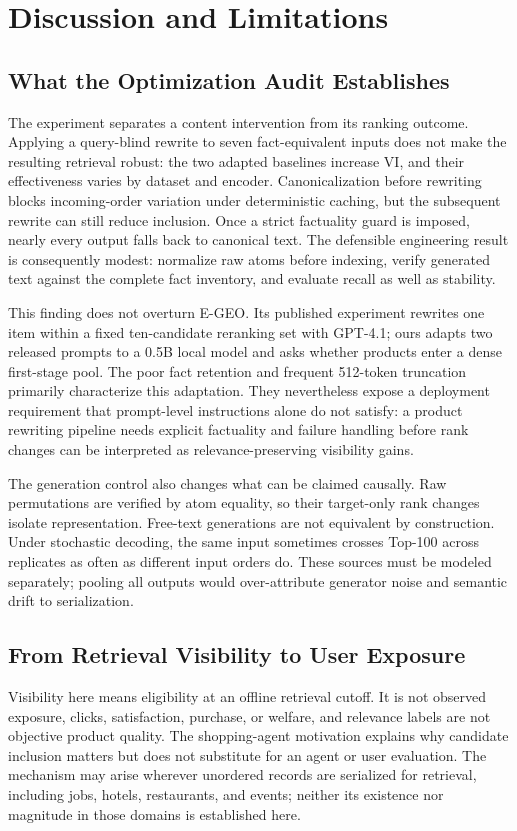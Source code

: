\section{Discussion and Limitations}
\subsection{What the Optimization Audit Establishes}
The experiment separates a content intervention from its ranking outcome. Applying a query-blind rewrite to seven fact-equivalent inputs does not make the resulting retrieval robust: the two adapted baselines increase VI, and their effectiveness varies by dataset and encoder. Canonicalization before rewriting blocks incoming-order variation under deterministic caching, but the subsequent rewrite can still reduce inclusion. Once a strict factuality guard is imposed, nearly every output falls back to canonical text. The defensible engineering result is consequently modest: normalize raw atoms before indexing, verify generated text against the complete fact inventory, and evaluate recall as well as stability.

This finding does not overturn E-GEO. Its published experiment rewrites one item within a fixed ten-candidate reranking set with GPT-4.1; ours adapts two released prompts to a 0.5B local model and asks whether products enter a dense first-stage pool. The poor fact retention and frequent 512-token truncation primarily characterize this adaptation. They nevertheless expose a deployment requirement that prompt-level instructions alone do not satisfy: a product rewriting pipeline needs explicit factuality and failure handling before rank changes can be interpreted as relevance-preserving visibility gains.

The generation control also changes what can be claimed causally. Raw permutations are verified by atom equality, so their target-only rank changes isolate representation. Free-text generations are not equivalent by construction. Under stochastic decoding, the same input sometimes crosses Top-100 across replicates as often as different input orders do. These sources must be modeled separately; pooling all outputs would over-attribute generator noise and semantic drift to serialization.

\subsection{From Retrieval Visibility to User Exposure}
Visibility here means eligibility at an offline retrieval cutoff. It is not observed exposure, clicks, satisfaction, purchase, or welfare, and relevance labels are not objective product quality. The shopping-agent motivation explains why candidate inclusion matters but does not substitute for an agent or user evaluation. The mechanism may arise wherever unordered records are serialized for retrieval, including jobs, hotels, restaurants, and events; neither its existence nor magnitude in those domains is established here.

